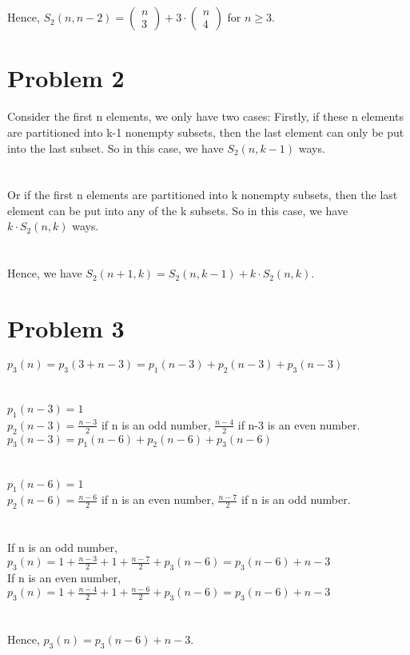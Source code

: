 \documentclass{article}
\begin{document}
\\ \hspace*{\fill} \\
Hence, $S_2(n,n-2) =
\begin{pmatrix}
n\\
3
\end{pmatrix} + 3 \cdot
\begin{pmatrix}
n\\
4
\end{pmatrix}$ for $n \geq 3$.
\newpage
\section{Problem 2}
Consider the first n elements, we only have two cases: Firstly, if these n elements are partitioned into k-1 nonempty subsets, then the last element can only be put into the last subset. So in this case, we have $S_2(n,k-1)$ ways.\\
\\ \hspace*{\fill} \\
Or if the first n elements are partitioned into k nonempty subsets, then the last element can be put into any of the k subsets. So in this case, we have $k \cdot S_2(n,k)$ ways.\\
\\ \hspace*{\fill} \\
Hence, we have $S_2(n+1,k) = S_2(n,k-1) + k \cdot S_2(n,k)$.
\section{Problem 3}
$p_3(n) = p_3(3 + n - 3) = p_1(n-3) + p_2(n-3) + p_3(n-3)$\\
\\ \hspace*{\fill} \\
$p_1(n-3) = 1$\\
$p_2(n-3) = \frac{n-3}{2}$ if n is an odd number, $\frac{n-4}{2}$ if n-3 is an even number.\\
$p_3(n-3) = p_1(n-6) + p_2(n-6) + p_3(n-6)$\\
\\ \hspace*{\fill} \\
$p_1(n-6) = 1$\\
$p_2(n-6) = \frac{n-6}{2}$ if n is an even number, $\frac{n-7}{2}$ if n is an odd number.\\
\\ \hspace*{\fill} \\
If n is an odd number, $p_3(n) = 1 + \frac{n-3}{2} + 1 + \frac{n-7}{2} + p_3(n-6) = p_3(n-6) + n - 3 $\\
If n is an even number, $p_3(n) = 1 + \frac{n-4}{2} + 1 + \frac{n-6}{2} + p_3(n-6) = p_3(n-6) + n - 3 $\\
\\ \hspace*{\fill} \\
Hence, $p_3(n) = p_3(n-6) + n - 3$.
\newpage
\end{document}
